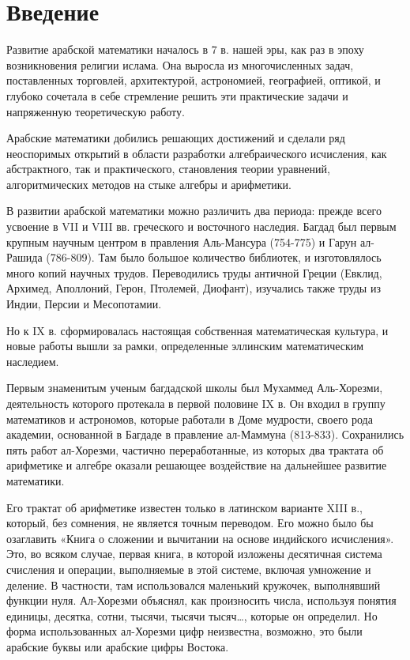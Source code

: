 \section{Введение}
Развитие арабской математики началось в 7 в. нашей эры, как раз  в эпоху возникновения религии  ислама. Она выросла из многочисленных  задач, поставленных торговлей, архитектурой, астрономией, географией, оптикой, и глубоко сочетала  в себе стремление решить эти практические задачи и напряженную  теоретическую работу.

Арабские  математики добились решающих  достижений и сделали ряд неоспоримых   открытий в области разработки  алгебраического исчисления, как  абстрактного, так и практического,  становления теории уравнений, алгоритмических методов на стыке алгебры и арифметики.

В развитии арабской математики  можно  различить два периода:  прежде всего  усвоение в  VII и VIII вв. греческого и восточного  наследия. Багдад был первым крупным  научным центром в правления Аль-Мансура (754-775) и Гарун ал-Рашида (786-809). Там было большое количество  библиотек, и изготовлялось много  копий научных трудов. Переводились  труды античной Греции (Евклид, Архимед,  Аполлоний, Герон, Птолемей, Диофант), изучались также труды из Индии, Персии и Месопотамии. 

Но  к IX в. сформировалась настоящая  собственная математическая культура, и новые работы вышли за  рамки, определенные эллинским  математическим наследием.

Первым  знаменитым ученым багдадской  школы был Мухаммед Аль-Хорезми, деятельность которого протекала в первой половине IX в. Он входил в группу математиков и астрономов, которые работали в Доме мудрости, своего рода академии, основанной в Багдаде в правление ал-Маммуна (813-833). Сохранились пять работ ал-Хорезми, частично переработанные, из которых два трактата об арифметике и алгебре оказали решающее воздействие на дальнейшее развитие математики.

Его  трактат об арифметике известен  только в латинском варианте XIII в., который, без сомнения, не является  точным переводом. Его можно  было бы озаглавить «Книга  о сложении и вычитании на  основе индийского исчисления».  Это, во всяком случае, первая  книга, в которой изложены десятичная  система счисления и операции, выполняемые в этой системе,  включая умножение и деление.  В частности, там использовался  маленький кружочек, выполнявший  функции нуля. Ал-Хорезми объяснял, как произносить числа, используя понятия единицы, десятка, сотни, тысячи, тысячи тысяч…, которые он определил. Но форма использованных ал-Хорезми цифр неизвестна, возможно, это были арабские буквы или арабские цифры Востока.
 
